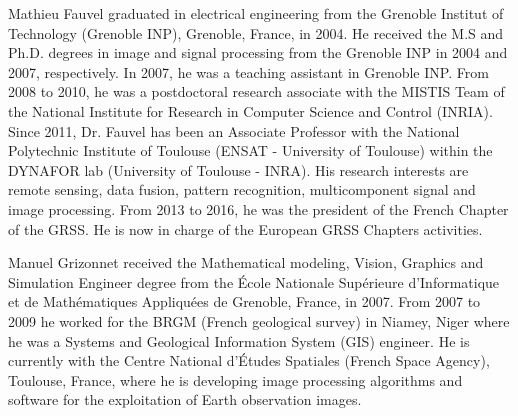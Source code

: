 \documentclass[journal,10pt]{IEEEtran}
\begin{document}
\begin{IEEEbiography}{Mathieu Fauvel}
 graduated in  electrical engineering  from the Grenoble  Institut of
 Technology (Grenoble  INP), Grenoble, France, in  2004.  He  received
 the M.S and  Ph.D.  degrees in image and signal  processing from  the
 Grenoble INP  in 2004  and 2007,  respectively.  In  2007, he  was a
 teaching assistant  in Grenoble  INP. From  2008 to  2010, he  was a
 postdoctoral research associate with the MISTIS Team of the  National
 Institute  for Research  in  Computer Science  and Control  (INRIA).
 Since 2011,  Dr.  Fauvel  has been an  Associate Professor  with  the
 National Polytechnic  Institute of  Toulouse (ENSAT -  University of
 Toulouse) within  the DYNAFOR lab  (University of Toulouse  -  INRA).
 His  research interests  are  remote sensing,  data fusion,  pattern
 recognition, multicomponent signal and image processing. From  2013 to 2016,
 he was the president of the French Chapter of the GRSS. He is  now in charge of the European GRSS Chapters activities.
\end{IEEEbiography}

\begin{IEEEbiography}{Manuel Grizonnet} received the Mathematical modeling, Vision, Graphics and
  Simulation Engineer degree from the \'{E}cole Nationale Sup\'{e}rieure d'Informatique
  et de Math\'{e}matiques Appliqu\'{e}es de Grenoble, France, in 2007. From 2007 to 2009
  he worked for the BRGM (French geological survey) in Niamey, Niger where he was a
  Systems and Geological Information System (GIS) engineer. He is currently with
  the Centre National d'\'{E}tudes Spatiales (French Space Agency), Toulouse,
  France, where he is developing image processing algorithms and software for
  the exploitation of Earth observation images.
\end{IEEEbiography}


\end{document}
